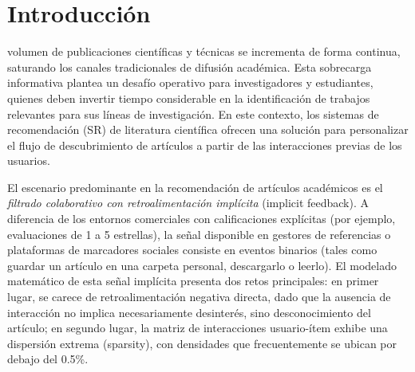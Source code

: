 \documentclass[journal]{IEEEtran}
\begin{document}
\section{Introducción}
 volumen de publicaciones científicas y técnicas se incrementa de forma continua, saturando los canales tradicionales de difusión académica. Esta sobrecarga informativa plantea un desafío operativo para investigadores y estudiantes, quienes deben invertir tiempo considerable en la identificación de trabajos relevantes para sus líneas de investigación. En este contexto, los sistemas de recomendación (SR) de literatura científica ofrecen una solución para personalizar el flujo de descubrimiento de artículos a partir de las interacciones previas de los usuarios.

El escenario predominante en la recomendación de artículos académicos es el \emph{filtrado colaborativo con retroalimentación implícita} (implicit feedback). A diferencia de los entornos comerciales con calificaciones explícitas (por ejemplo, evaluaciones de 1 a 5 estrellas), la señal disponible en gestores de referencias o plataformas de marcadores sociales consiste en eventos binarios (tales como guardar un artículo en una carpeta personal, descargarlo o leerlo). El modelado matemático de esta señal implícita presenta dos retos principales: en primer lugar, se carece de retroalimentación negativa directa, dado que la ausencia de interacción no implica necesariamente desinterés, sino desconocimiento del artículo; en segundo lugar, la matriz de interacciones usuario-ítem exhibe una dispersión extrema (sparsity), con densidades que frecuentemente se ubican por debajo del 0.5\%.
\end{document}
